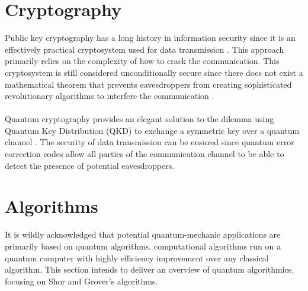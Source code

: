 \documentclass[12pt]{third-rep}
\begin{document}
\section{Cryptography}
Public key cryptography has a long history in information security since it is an effectively practical cryptosystem used for data transmission \cite{public-crypto}. This approach primarily relies on the complexity of how to crack the communication. This cryptosystem is still considered unconditionally secure since there does not exist a mathematical theorem that prevents eavesdroppers from creating sophisticated revolutionary algorithms to interfere the communication \cite{qc-security}. \\\\
Quantum cryptography provides an elegant solution to the dilemma using Quantum Key Distribution (QKD) to exchange a symmetric key over a quantum channel \cite{qkd}. The security of data transmission can be ensured since quantum error correction codes allow all parties of the communication channel to be able to detect the presence of potential eavesdroppers.

\section{Algorithms}
It is wildly acknowledged that potential quantum-mechanic applications are primarily based on quantum algorithms, computational algorithms run on a quantum computer with highly efficiency improvement over any classical algorithm. This section intends to deliver an overview of quantum algorithmics, focusing on Shor and Grover's algorithms.
\end{document}
